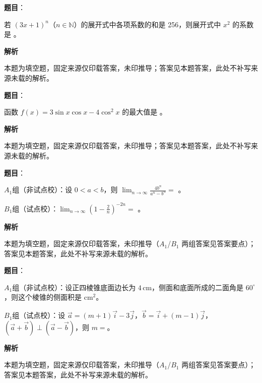 \begin{answer}

\textbf{题目}：

若 $(3x+1)^n$（$n\in\mathbb N$）的展开式中各项系数的和是 256，则展开式中 $x^2$ 的系数是 \gkblank{}。

\textbf{解析}

本题为填空题，固定来源仅印载答案，未印推导；答案见本题答案，此处不补写来源未载的解析。


\end{answer}
\begin{answer}

\textbf{题目}：

函数 $f(x)=3\sin x\cos x-4\cos^2x$ 的最大值是 \gkblank{}。

\textbf{解析}

本题为填空题，固定来源仅印载答案，未印推导；答案见本题答案，此处不补写来源未载的解析。


\end{answer}
\begin{answer}

\textbf{题目}：

$A_1$组（非试点校）：设 $0<a<b$，则 $\displaystyle\lim_{n\to\infty}\frac{4b^n}{a^n-b^n}=$ \gkblank{}。

$B_1$组（试点校）：$\displaystyle\lim_{n\to\infty}\left(1-\frac2n\right)^{-2n}=$ \gkblank{}。

\textbf{解析}

本题为填空题，固定来源仅印载答案，未印推导（$A_1$/$B_1$ 两组答案见答案要点）；答案见本题答案，此处不补写来源未载的解析。


\end{answer}
\begin{answer}

\textbf{题目}：

$A_1$组（非试点校）：设正四棱锥底面边长为 $4\,\mathrm{cm}$，侧面和底面所成的二面角是 $60^\circ$，则这个棱锥的侧面积是 \gkblank{} $\mathrm{cm}^2$。

$B_1$组（试点校）：设 $\vec a=(m+1)\vec i-3\vec j$，$\vec b=\vec i+(m-1)\vec j$，$(\vec a+\vec b)\perp(\vec a-\vec b)$，则 $m=$\gkblank{}。

\textbf{解析}

本题为填空题，固定来源仅印载答案，未印推导（$A_1$/$B_1$ 两组答案见答案要点）；答案见本题答案，此处不补写来源未载的解析。


\end{answer}
